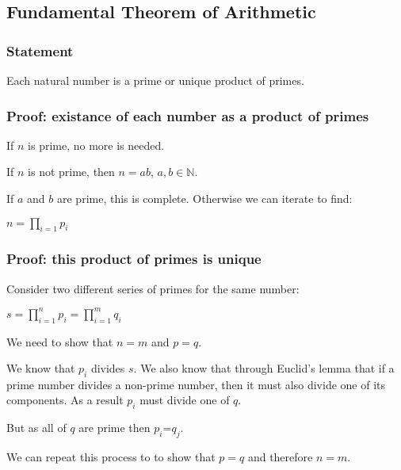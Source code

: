
\subsection{Fundamental Theorem of Arithmetic}

\subsubsection{Statement}

Each natural number is a prime or unique product of primes.

\subsubsection{Proof: existance of each number as a product of primes}

If \(n\) is prime, no more is needed.

If \(n\) is not prime, then \(n=ab\), \(a,b\in \mathbb{N} \).

If \(a\) and \(b\) are prime, this is complete. Otherwise we can iterate to find:

$n=\prod_{i=1} p_i$

\subsubsection{Proof: this product of primes is unique}

Consider two different series of primes for the same number:

$s=\prod_{i=1}^n p_i = \prod_{i=1}^m q_i$

We need to show that \(n=m\) and \({p}={q}\).

We know that \(p_i\) divides \(s\). We also know that through Euclid's lemma that if a prime number divides a non-prime number, then it must also divide one of its components. As a result \(p_i\) must divide one of \({q}\).

But as all of \({q}\) are prime then \(p_i\)=\(q_j\).

We can repeat this process to to show that \({p}={q}\) and therefore \(n=m\).

